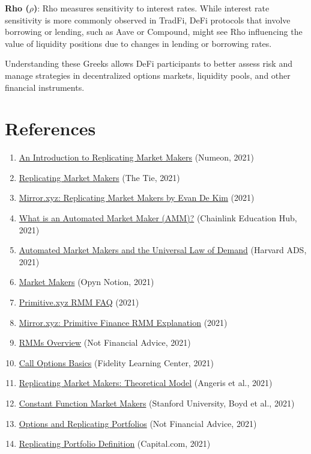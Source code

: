 \documentclass[12pt]{article}
\begin{document}
\textbf{Rho (\(\rho\))}: Rho measures sensitivity to interest rates. While interest rate sensitivity is more commonly observed in TradFi, DeFi protocols that involve borrowing or lending, such as Aave or Compound, might see Rho influencing the value of liquidity positions due to changes in lending or borrowing rates.

Understanding these Greeks allows DeFi participants to better assess risk and manage strategies in decentralized options markets, liquidity pools, and other financial instruments.

\section*{References}
\begin{enumerate}
    \item \href{https://medium.com/numoen/an-introduction-to-replicating-market-makers-de5c44d3c558}{An Introduction to Replicating Market Makers} (Numeon, 2021)
    \item \href{https://www.thetie.io/insights/research/rmm/}{Replicating Market Makers} (The Tie, 2021)
    \item \href{https://mirror.xyz/evandekim.eth/aUULTZFwhJ9XsOZ6XIbAYl1iaSncDKpDwKazCemJlI8}{Mirror.xyz: Replicating Market Makers by Evan De Kim} (2021)
    \item \href{https://chain.link/education-hub/what-is-an-automated-market-maker-amm}{What is an Automated Market Maker (AMM)?} (Chainlink Education Hub, 2021)
    \item \href{https://ui.adsabs.harvard.edu/abs/2021arXiv210314769A/abstract}{Automated Market Makers and the Universal Law of Demand} (Harvard ADS, 2021)
    \item \href{https://opynopyn.notion.site/Market-Makers-4ca991796d8b452fa1358344f941f624}{Market Makers} (Opyn Notion, 2021)
    \item \href{https://library.primitive.xyz/faq/usage/rmm}{Primitive.xyz RMM FAQ} (2021)
    \item \href{https://primitive.mirror.xyz/Audtl29HY_rnhN4E2LwnP7-zjDcDGAyXZ4h3QpDeajg}{Mirror.xyz: Primitive Finance RMM Explanation} (2021)
    \item \href{https://not-financial-advice.notion.site/RMMs-c5c6b0d9e190404c94d66241178454da}{RMMs Overview} (Not Financial Advice, 2021)
    \item \href{https://www.fidelity.com/learning-center/investment-products/options/call-options-basics}{Call Options Basics} (Fidelity Learning Center, 2021)
    \item \href{https://angeris.github.io/papers/rmms.pdf}{Replicating Market Makers: Theoretical Model} (Angeris et al., 2021)
    \item \href{https://web.stanford.edu/~boyd/papers/pdf/cfmm.pdf}{Constant Function Market Makers} (Stanford University, Boyd et al., 2021)
    \item \href{https://not-financial-advice.notion.site/Options-364981cc38bf4c55b45976a715d79604}{Options and Replicating Portfolios} (Not Financial Advice, 2021)
    \item \href{https://capital.com/replicating-portfolio-definition}{Replicating Portfolio Definition} (Capital.com, 2021)
\end{enumerate}
\end{document}
